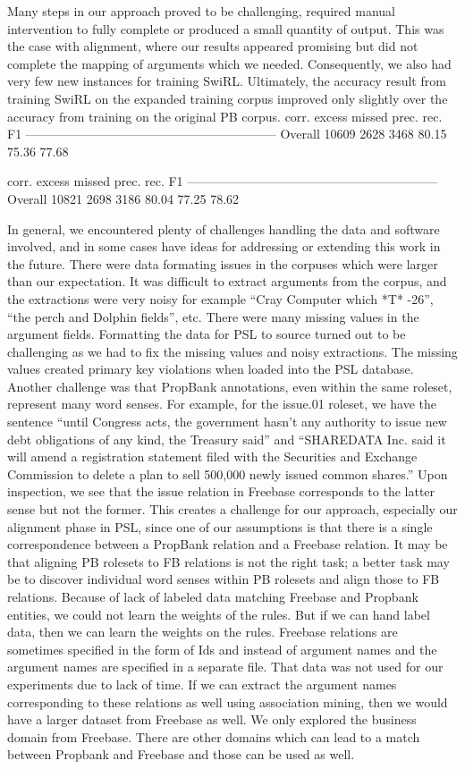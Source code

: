 Many steps in our approach proved to be challenging, required manual intervention to fully complete or produced a small quantity of output.  This was the case with alignment, where our results appeared promising but did not complete the mapping of arguments which we needed.  Consequently, we also had very few new instances for training SwiRL.  Ultimately, the accuracy result from training SwiRL on the expanded training corpus improved only slightly over the accuracy from training on the original PB corpus.
             corr.  excess  missed    prec.    rec.      F1
------------------------------------------------------------
  Overall    10609    2628    3468    80.15   75.36   77.68

             corr.  excess  missed    prec.    rec.      F1
------------------------------------------------------------
  Overall    10821    2698    3186    80.04   77.25   78.62


In general, we encountered plenty of challenges handling the data and software involved, and in some cases have ideas for addressing or extending this work in the future.
There were data formating issues in the corpuses which were larger than our expectation.  It was difficult to extract arguments from the corpus, and the extractions were very noisy for example “Cray Computer which *T* -26”, “the perch and Dolphin fields”, etc.
There were many missing values in the argument fields. Formatting the data for PSL to source turned out to be challenging as we had to fix the missing values and noisy extractions. The missing values created primary key violations when loaded into the PSL database.
Another challenge was that PropBank annotations, even within the same roleset, represent many word senses.  For example, for the issue.01 roleset, we have the sentence “until Congress acts, the government hasn't any authority to issue new debt obligations of any kind, the Treasury said” and “SHAREDATA Inc. said it will amend a registration statement filed with the Securities and Exchange Commission to delete a plan to sell 500,000 newly issued common shares.”  Upon inspection, we see that the issue relation in Freebase corresponds to the latter sense but not the former.  This creates a challenge for our approach, especially our alignment phase in PSL, since one of our assumptions is that there is a single correspondence between a PropBank relation and a Freebase relation.   It may be that aligning PB rolesets to FB relations is not the right task; a better task may be to discover individual word senses within PB rolesets and align those to FB relations.
Because of lack of labeled data matching Freebase and Propbank entities, we could not learn the weights of the rules. But if we can hand label data, then we can learn the weights on the rules.
Freebase relations are sometimes specified in the form of Ids and instead of argument names and the argument names are specified in a separate file. That data was not used for our experiments due to lack of time. If we can extract the argument names corresponding to these relations as well using association mining, then we would have a larger dataset from Freebase as well.
We only explored the business domain from Freebase. There are other domains which can lead to a match between Propbank and Freebase and those can be used as well.


